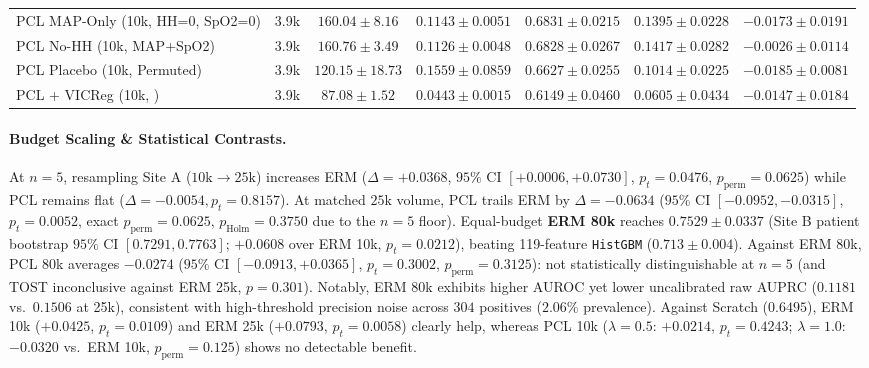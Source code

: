 \documentclass[10pt,twocolumn]{article}
\begin{document}
\begin{table}[t]
\begin{tabular}{lcccccc}
\midrule
PCL MAP-Only (10k, HH=0, SpO2=0) & 3.9k & $160.04 \pm 8.16$ & $0.1143 \pm 0.0051$ & $0.6831 \pm 0.0215$ & $0.1395 \pm 0.0228$ & $-0.0173 \pm 0.0191$ \\
PCL No-HH (10k, MAP+SpO2) & 3.9k & $160.76 \pm 3.49$ & $0.1126 \pm 0.0048$ & $0.6828 \pm 0.0267$ & $0.1417 \pm 0.0282$ & $-0.0026 \pm 0.0114$ \\
PCL Placebo (10k, Permuted) & 3.9k & $120.15 \pm 18.73$ & $0.1559 \pm 0.0859$ & $0.6627 \pm 0.0255$ & $0.1014 \pm 0.0225$ & $-0.0185 \pm 0.0081$ \\
PCL + VICReg (10k, \cite{bardes2022vicreg}) & 3.9k & $87.08 \pm 1.52$ & $0.0443 \pm 0.0015$ & $0.6149 \pm 0.0460$ & $0.0605 \pm 0.0434$ & $-0.0147 \pm 0.0184$ \\
\bottomrule
\end{tabular}
\end{table}

\paragraph{Budget Scaling \& Statistical Contrasts.}
At $n=5$, resampling Site A ($10\text{k} \to 25\text{k}$) increases ERM ($\Delta = +0.0368$, $95\%$ CI $[+0.0006, +0.0730]$, $p_t = 0.0476$, $p_{\mathrm{perm}} = 0.0625$) while PCL remains flat ($\Delta = -0.0054, p_t = 0.8157$). At matched $25\text{k}$ volume, PCL trails ERM by $\Delta = -0.0634$ ($95\%$ CI $[-0.0952, -0.0315]$, $p_t = 0.0052$, exact $p_{\mathrm{perm}} = 0.0625$, $p_{\mathrm{Holm}} = 0.3750$ due to the $n=5$ floor). Equal-budget \textbf{ERM 80k} reaches $\mathbf{0.7529 \pm 0.0337}$ (Site B patient bootstrap $95\%$ CI $[0.7291, 0.7763]$; $+0.0608$ over ERM 10k, $p_t = 0.0212$), beating 119-feature \texttt{HistGBM} ($0.713 \pm 0.004$). Against ERM 80k, PCL 80k averages $-0.0274$ ($95\%$ CI $[-0.0913, +0.0365]$, $p_t = 0.3002$, $p_{\mathrm{perm}} = 0.3125$): not statistically distinguishable at $n=5$ (and TOST inconclusive against ERM 25k, $p=0.301$). Notably, ERM 80k exhibits higher AUROC yet lower uncalibrated raw AUPRC ($0.1181$ vs.\ $0.1506$ at 25k), consistent with high-threshold precision noise across $304$ positives ($2.06\%$ prevalence). Against Scratch ($0.6495$), ERM 10k ($+0.0425$, $p_t = 0.0109$) and ERM 25k ($+0.0793$, $p_t = 0.0058$) clearly help, whereas PCL 10k ($\lambda=0.5$: $+0.0214$, $p_t = 0.4243$; $\lambda=1.0$: $-0.0320$ vs.\ ERM 10k, $p_{\mathrm{perm}}=0.125$) shows no detectable benefit.
\end{document}
